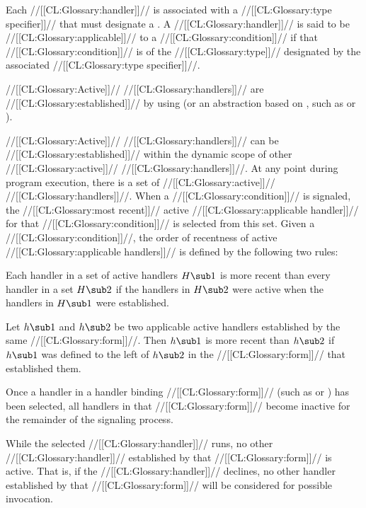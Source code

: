 Each //[[CL:Glossary:handler]]// is associated with a //[[CL:Glossary:type specifier]]//
that must designate a .  A //[[CL:Glossary:handler]]//
is said to be //[[CL:Glossary:applicable]]// to a //[[CL:Glossary:condition]]// if that
//[[CL:Glossary:condition]]// is of the //[[CL:Glossary:type]]// designated by the associated
//[[CL:Glossary:type specifier]]//.

//[[CL:Glossary:Active]]// //[[CL:Glossary:handlers]]// are //[[CL:Glossary:established]]// by using 
 (or an abstraction based on , 
such as  or ).
 
//[[CL:Glossary:Active]]// //[[CL:Glossary:handlers]]// can be //[[CL:Glossary:established]]// within the
dynamic scope of other //[[CL:Glossary:active]]// //[[CL:Glossary:handlers]]//.
At any point during program execution, there is a set of //[[CL:Glossary:active]]// //[[CL:Glossary:handlers]]//.
When a //[[CL:Glossary:condition]]// is signaled, the //[[CL:Glossary:most recent]]// active //[[CL:Glossary:applicable handler]]//
for that //[[CL:Glossary:condition]]// is selected from this set.
Given a //[[CL:Glossary:condition]]//, the order of recentness of 
active //[[CL:Glossary:applicable handlers]]// is defined by the following two rules:
 
\beginlist
 
  Each handler in a set of active handlers $H\sub 1$ is
more recent than every handler in a set $H\sub 2$ if the
handlers in $H\sub 2$ were active when the handlers in $H\sub 1$ were
established.
 
  Let $h\sub 1$ and $h\sub 2$ be two applicable active
handlers established by the same //[[CL:Glossary:form]]//. Then $h\sub 1$ is
more recent than $h\sub 2$ if $h\sub 1$ was defined to the left of
$h\sub 2$ in the //[[CL:Glossary:form]]// that established them.
 
\endlist
 



Once a handler in a handler binding //[[CL:Glossary:form]]// (such as 
 or ) has been selected, all
handlers in that //[[CL:Glossary:form]]// become inactive for 
the remainder of the signaling process.

While the selected //[[CL:Glossary:handler]]// runs, no other //[[CL:Glossary:handler]]// established
by that //[[CL:Glossary:form]]// is active. That is, if the //[[CL:Glossary:handler]]// declines, 
no other handler established by that //[[CL:Glossary:form]]// will be considered for possible invocation.


